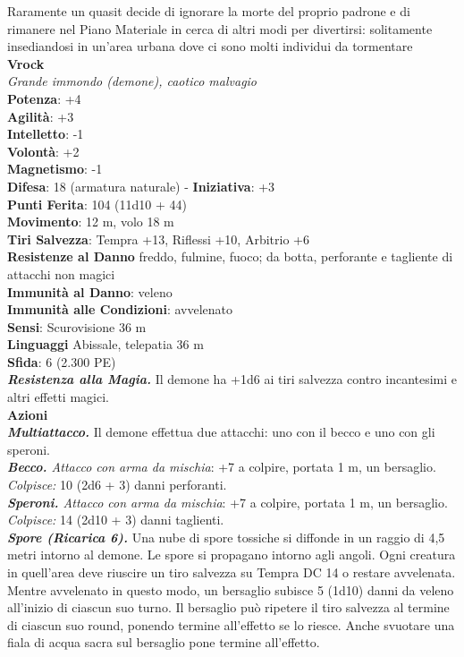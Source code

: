 \begin{multicols}{2}
Raramente un quasit decide di ignorare la morte del proprio padrone e di rimanere nel Piano Materiale in cerca di altri modi per divertirsi: solitamente insediandosi in un'area urbana dove ci sono molti individui da tormentare\\

\medskip\textbf{Vrock}\\
\emph{Grande immondo (demone), caotico malvagio}\\
\textbf{Potenza}: +4\\
\textbf{Agilità}: +3\\
\textbf{Intelletto}: -1\\
\textbf{Volontà}: +2\\
\textbf{Magnetismo}: -1\\
\textbf{Difesa}: 18 (armatura naturale) - \textbf{Iniziativa}: +3\\
\textbf{Punti Ferita}: 104 (11d10 + 44)\\
\textbf{Movimento}: 12 m, volo 18 m\\
\textbf{Tiri Salvezza}: Tempra +13, Riflessi +10, Arbitrio +6\\
\textbf{Resistenze al Danno} freddo, fulmine, fuoco; da botta, perforante e tagliente di attacchi non magici\\
\textbf{Immunità al Danno}: veleno\\
\textbf{Immunità alle Condizioni}: avvelenato\\
\textbf{Sensi}: Scurovisione 36 m \\
\textbf{Linguaggi} Abissale, telepatia 36 m \\
\textbf{Sfida}: 6 (2.300 PE)\smallskip\\
\emph{\textbf{Resistenza alla Magia.}} Il demone ha +1d6 ai tiri salvezza contro incantesimi e altri effetti magici.\\
\smallskip\textbf{Azioni}\\
\emph{\textbf{Multiattacco.}} Il demone effettua due attacchi: uno con il becco e uno con gli speroni.\\
\emph{\textbf{Becco.} Attacco con arma da mischia}: +7 a colpire, portata 1 m, un bersaglio.\\
\emph{Colpisce:} 10 (2d6 + 3) danni perforanti.\\
\emph{\textbf{Speroni.} Attacco con arma da mischia}: +7 a colpire, portata 1 m, un bersaglio.\\
\emph{Colpisce:} 14 (2d10 + 3) danni taglienti.\\
\emph{\textbf{Spore (Ricarica 6).}} Una nube di spore tossiche si diffonde in un raggio di 4,5 metri intorno al demone. Le spore si propagano intorno agli angoli. Ogni creatura in quell'area deve riuscire un tiro salvezza su Tempra DC 14 o restare avvelenata. Mentre  avvelenato in questo modo, un bersaglio subisce 5 (1d10) danni da veleno all'inizio di ciascun suo turno. Il bersaglio può ripetere il tiro salvezza al termine di ciascun suo round, ponendo termine all'effetto se lo riesce. Anche svuotare una fiala di acqua sacra sul bersaglio pone termine all'effetto.\\

\end{multicols}
